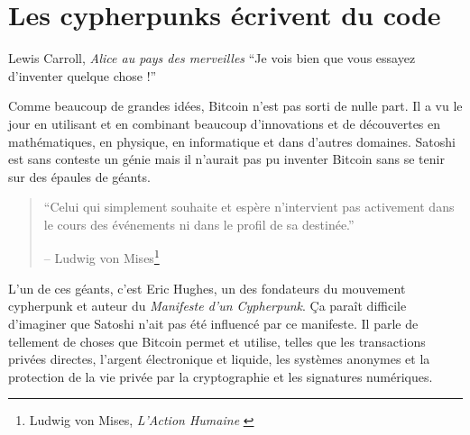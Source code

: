 \chapter{Les cypherpunks écrivent du code}
\label{les:20}

\begin{chapquote}{Lewis Carroll, \textit{Alice au pays des merveilles}}
\enquote{Je vois bien que vous essayez d’inventer quelque chose !}
\end{chapquote}

Comme beaucoup de grandes idées, Bitcoin n'est pas sorti de nulle part. Il a vu
le jour en utilisant et en combinant beaucoup d'innovations et de découvertes en
mathématiques, en physique, en informatique et dans d'autres domaines. Satoshi
est sans conteste un génie mais il n'aurait pas pu inventer Bitcoin sans se
tenir sur des épaules de géants.

\begin{quotation}\begin{samepage}

\enquote{Celui qui simplement souhaite et espère n'intervient pas activement
dans le cours des événements ni dans le profil de sa destinée.}
\begin{flushright} -- Ludwig von Mises\footnote{Ludwig von Mises,
\textit{L’Action Humaine} \cite{human-action}}
\end{flushright}\end{samepage}\end{quotation}

L'un de ces géants, c'est Eric Hughes, un des fondateurs du mouvement cypherpunk
et auteur du \textit{Manifeste d'un Cypherpunk}. Ça paraît difficile d'imaginer
que Satoshi n'ait pas été influencé par ce manifeste. Il parle de tellement de
choses que Bitcoin permet et utilise, telles que les transactions privées
directes, l'argent électronique et liquide, les systèmes anonymes et la
protection de la vie privée par la cryptographie et les signatures numériques.

